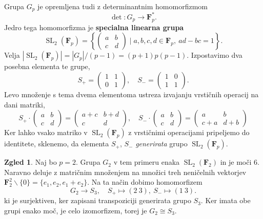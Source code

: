\documentclass[11pt]{book}
\def\FF{\mathbf{F}}
\DeclareMathOperator\SL{SL}
\def\definicija{\color{rdeca}\bf}
\theoremstyle{definition}
\theoremstyle{zgled}
\newtheorem{zgled}[theorem]{Zgled}
\theoremstyle{zgledbrezstevilke}
\theoremstyle{odprtproblem}
\theoremstyle{domacanaloga}
\theoremstyle{izrek}
\begin{document}
Grupa $G_p$ je opremljena tudi z determinantnim homomorfizmom
\[
    \det \colon G_p \to \FF_p^*.
\]
Jedro tega homomorfizma je {\definicija specialna linearna grupa}
\[
    {\textstyle \SL_2(\FF_p)} = \left\{ \begin{pmatrix} a & b \\ c & d \end{pmatrix} \mid a,b,c,d \in \FF_p, \ ad - bc = 1 \right\}.
\]
Velja $|\SL_2(\FF_p)| = |G_p|/(p-1) = (p+1)p(p-1)$. Izpostavimo dva posebna elementa te grupe,
\[
    S_+ = \begin{pmatrix}
        1 & 1 \\ 0 & 1
    \end{pmatrix}, \quad
    S_- = \begin{pmatrix}
        1 & 0 \\ 1 & 1
    \end{pmatrix}.
\]
Levo množenje s tema dvema elementoma ustreza izvajanju vrstičnih operacij na dani matriki,
\[
    S_+ \cdot 
    \begin{pmatrix}
        a & b \\ c & d
    \end{pmatrix}
    = 
    \begin{pmatrix}
        a+c & b+d \\ c & d
    \end{pmatrix}, \quad
    S_- \cdot 
    \begin{pmatrix}
        a & b \\ c & d
    \end{pmatrix}
    = 
    \begin{pmatrix}
        a & b \\ c+a & d+b
    \end{pmatrix}
\]
Ker lahko vsako matriko v $\SL_2(\FF_p)$ z vrstičnimi operacijami pripeljemo do identitete, sklenemo, da elementa $S_+$, $S_-$ \emph{generirata} grupo $\SL_2(\FF_p)$. 

\begin{zgled}
    Naj bo $p = 2$. Grupa $G_2$ v tem primeru enaka $\SL_2(\FF_2)$ in je moči $6$. Naravno deluje z matričnim množenjem na množici treh neničelnih vektorjev $\FF_2^2 \backslash \{ 0 \} = \{ e_1, e_2, e_1 + e_2 \}$. Na ta način dobimo homomorfizem
    \[
        G_2 \to S_3, \quad
        S_+ \mapsto (2 \ 3), \ 
        S_- \mapsto (1 \ 3).
        \]
    ki je surjektiven, ker zapisani transpoziciji generirata grupo $S_3$. Ker imata obe grupi enako moč, je celo izomorfizem, torej je $G_2 \cong S_3$.
\end{zgled}
\end{document}
